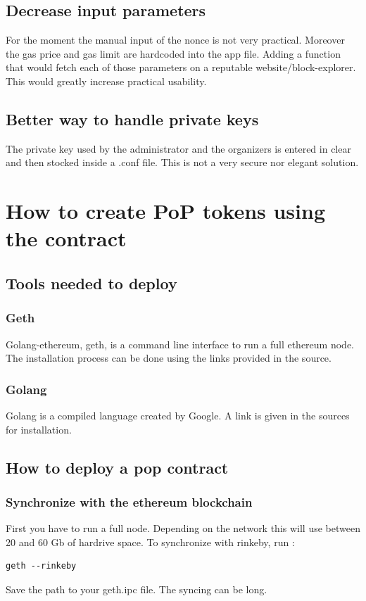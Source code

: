 \documentclass[11pt, a4paper, twoside, openright]{article} %
\begin{document}
\subsection{Decrease input parameters}
For the moment the manual input of the nonce is not very practical. Moreover the gas price and gas limit are hardcoded into the app file. Adding a function that would fetch each of those parameters on a reputable website/block-explorer. This would greatly increase practical usability.

\subsection{Better way to handle private keys}
The private key used by the administrator and the organizers is entered in clear and then stocked inside a .conf file. This is not a very secure nor elegant solution.


\section{How to create PoP tokens using the contract}

\subsection{Tools needed to deploy}
\subsubsection*{Geth}
Golang-ethereum, geth, is a command line interface to run a full ethereum node. The installation process can be done using the links provided in the source.
\subsubsection*{Golang}
Golang is a compiled language created by Google. A link is given in the sources for installation.

\subsection{How to deploy a pop contract}
\subsubsection*{Synchronize with the ethereum blockchain}
First you have to run a full node. Depending on the network this will use between 20 and 60 Gb of hardrive space. To synchronize with rinkeby, run :
\begin{verbatim}
geth --rinkeby
\end{verbatim}
Save the path to your geth.ipc file.
The syncing can be long.
\end{document}
